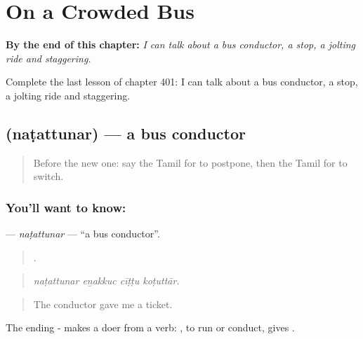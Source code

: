 
\chapter{On a Crowded Bus}
\label{ch:ta-on-a-crowded-bus}

\begin{chapteropening}
\textbf{By the end of this chapter:} \emph{I can talk about a bus conductor, a stop, a jolting ride and staggering.}

Complete the last lesson of chapter 401: I can talk about a bus conductor, a stop, a jolting ride and staggering.
\end{chapteropening}

\section[\texorpdfstring{\ta{நடத்துநர்} (naṭattunar)}{நடத்துநர் (naṭattunar)}]{ (naṭattunar) — a bus conductor}

\label{lesson:TA-C401-natattunar}



\begin{quote}
Before the new one: say the Tamil for to postpone, then the Tamil for to switch.
\end{quote}

\subsection*{You'll want to know: }
\textbf{} — \emph{naṭattunar} — \textquotedblleft{}a bus conductor\textquotedblright{}.

\begin{quote}
   .
\end{quote}

\begin{quote}
\emph{naṭattunar eṉakkuc cīṭṭu koṭuttār.}
\end{quote}

\begin{quote}
The conductor gave me a ticket.
\end{quote}

The ending - makes a doer from a verb: , to run or conduct, gives .

